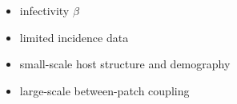 \begin{itemize}
    \item infectivity $\beta$
    \item limited incidence data
    \item small-scale host structure and demography
    \item large-scale between-patch coupling
\end{itemize}








